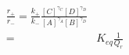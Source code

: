 \begin{eqnarray}
\frac{r_+}{r_-}  = \frac{k_+}{k_-}\frac{[C]^{\gamma_C}[D]^{\gamma_D}}{[A]^{\gamma_A}[B]^{\gamma_D}} \\
 = & K_{eq}\frac{1}{Q_r} \\
\end{eqnarray}